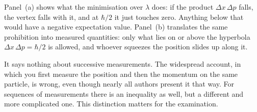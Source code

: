 

Panel~(a) shows what the minimisation over $\lambda$ does: if the product
$\Delta x\,\Delta p$ falls, the vertex falls with it, and at $\hbar/2$ it just
touches zero. Anything below that would have a negative expectation value.
Panel~(b) translates the same prohibition into measured quantities: only what lies on
or above the hyperbola $\Delta x\,\Delta p=\hbar/2$ is allowed, and whoever squeezes the
position slides up along it.

\begin{merksatz}
It says nothing about successive measurements. The widespread account, in which you first measure the position and then the momentum on the same particle, is wrong, even though nearly all authors present it that way. For sequences of measurements there is an inequality as well, but a different and more complicated one. This distinction matters for the examination.
\end{merksatz}